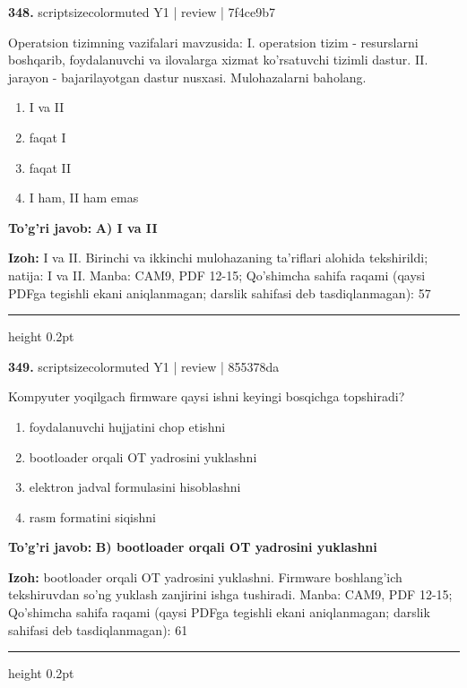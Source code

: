 \documentclass[10pt,a4paper]{article}
\begin{document}
{\bfseries\sffamily\color{ink} 348.} {scriptsizecolor{muted} Y1 | review | 7f4ce9b7}
\par
Operatsion tizimning vazifalari mavzusida: I. operatsion tizim - resurslarni boshqarib, foydalanuvchi va ilovalarga xizmat ko'rsatuvchi tizimli dastur. II. jarayon - bajarilayotgan dastur nusxasi. Mulohazalarni baholang.
\begin{enumerate}[label=\Alph*),leftmargin=9mm]
\item I va II
\item faqat I
\item faqat II
\item I ham, II ham emas
\end{enumerate}
\begin{tcolorbox}[enhanced,breakable,colback=teal!4,colframe=teal!60!black,boxrule=0.45pt,arc=1.2mm,left=2.7mm,right=2.7mm,top=1.8mm,bottom=1.8mm,before skip=2mm,after skip=2mm]
{\bfseries\sffamily\color{teal}To'g'ri javob:} \textbf{A) I va II}
\par\smallskip
{\bfseries Izoh:} I va II. Birinchi va ikkinchi mulohazaning ta'riflari alohida tekshirildi; natija: I va II. Manba: CAM9, PDF 12-15; Qo'shimcha sahifa raqami (qaysi PDFga tegishli ekani aniqlanmagan; darslik sahifasi deb tasdiqlanmagan): 57
\end{tcolorbox}
\vspace{2mm}\hrule height 0.2pt\vspace{3mm}

{\bfseries\sffamily\color{ink} 349.} {scriptsizecolor{muted} Y1 | review | 855378da}
\par
Kompyuter yoqilgach firmware qaysi ishni keyingi bosqichga topshiradi?
\begin{enumerate}[label=\Alph*),leftmargin=9mm]
\item foydalanuvchi hujjatini chop etishni
\item bootloader orqali OT yadrosini yuklashni
\item elektron jadval formulasini hisoblashni
\item rasm formatini siqishni
\end{enumerate}
\begin{tcolorbox}[enhanced,breakable,colback=teal!4,colframe=teal!60!black,boxrule=0.45pt,arc=1.2mm,left=2.7mm,right=2.7mm,top=1.8mm,bottom=1.8mm,before skip=2mm,after skip=2mm]
{\bfseries\sffamily\color{teal}To'g'ri javob:} \textbf{B) bootloader orqali OT yadrosini yuklashni}
\par\smallskip
{\bfseries Izoh:} bootloader orqali OT yadrosini yuklashni. Firmware boshlang'ich tekshiruvdan so'ng yuklash zanjirini ishga tushiradi. Manba: CAM9, PDF 12-15; Qo'shimcha sahifa raqami (qaysi PDFga tegishli ekani aniqlanmagan; darslik sahifasi deb tasdiqlanmagan): 61
\end{tcolorbox}
\vspace{2mm}\hrule height 0.2pt\vspace{3mm}
\end{document}
